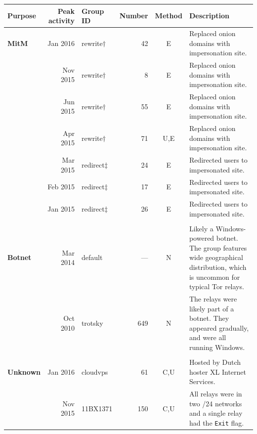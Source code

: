 \begin{table}[ht!]
\small
\centering
\begin{tabularx}{\textwidth}{l r l r c X}
\toprule
\textbf{Purpose} & \textbf{Peak activity} & \textbf{Group ID} & \textbf{Number} &
\textbf{Method} & \textbf{Description} \\
\midrule
\textbf{MitM} & Jan 2016 & rewrite$\dagger$ & 42 & \phantom{N,F,C,U,}E & Replaced onion domains
with impersonation site. \\

& Nov 2015 & rewrite$\dagger$ & 8 & \phantom{N,F,C,U,}E & Replaced onion domains with impersonation
site. \\

& Jun 2015 & rewrite$\dagger$ & 55 & \phantom{N,F,C,U,}E & Replaced onion domains with
impersonation site. \\

& Apr 2015 & rewrite$\dagger$ & 71 & \phantom{N,F,C,}U,E & Replaced onion domains with
impersonation site. \\

& Mar 2015 & redirect$\ddagger$ & 24 & \phantom{N,F,C,U,}E & Redirected users to impersonated site.
\\

& Feb 2015 & redirect$\ddagger$ & 17 & \phantom{N,F,C,U,}E & Redirected users to impersonated site.
\\

& Jan 2015 & redirect$\ddagger$ & 26 & \phantom{N,F,C,U,}E & Redirected users to impersonated site.
\\

& & & & & \\

\textbf{Botnet} & Mar 2014 & default & --- & N\phantom{,F,C,U,E} & Likely a Windows-powered
botnet.  The group features wide geographical distribution, which is uncommon
for typical Tor relays. \\

& Oct 2010 & trotsky & 649 & N\phantom{,F,C,U,E} & The relays were likely part of a botnet.  They
appeared gradually, and were all running Windows. \\

& & & & & \\

\textbf{Unknown} & Jan 2016 & cloudvps & 61 & \phantom{N,F,}C,U\phantom{,E} & Hosted by Dutch hoster XL
Internet Services. \\

& Nov 2015 & 11BX1371 & 150 & \phantom{N,F,}C,U\phantom{,E} & All relays were in two /24 networks and a
single relay had the \texttt{Exit} flag.  \\


\end{tabularx}
\end{table}
